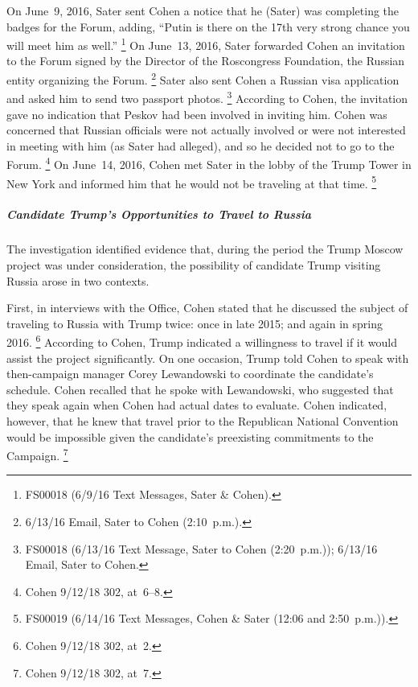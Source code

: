 On June~9, 2016, Sater sent Cohen a notice that he (Sater) was completing the badges for the Forum, adding, ``Putin is there on the 17th very strong chance you will meet him as well.''%
\footnote{FS00018 (6/9/16 Text Messages, Sater \& Cohen).}
On June~13, 2016, Sater forwarded Cohen an invitation to the Forum signed by the Director of the Roscongress Foundation, the Russian entity organizing the Forum.%
\footnote{6/13/16 Email, Sater to Cohen (2:10~p.m.).}
Sater also sent Cohen a Russian visa application and asked him to send two passport photos.%
\footnote{FS00018 (6/13/16 Text Message, Sater to Cohen (2:20~p.m.));
6/13/16 Email, Sater to Cohen.}
According to Cohen, the invitation gave no indication that Peskov had been involved in inviting him.
Cohen was concerned that Russian officials were not actually involved or were not interested in meeting with him (as Sater had alleged), and so he decided not to go to the Forum.%
\footnote{Cohen 9/12/18 302, at~6--8.}
On June~14, 2016, Cohen met Sater in the lobby of the Trump Tower in New York and informed him that he would not be traveling at that time.%
\footnote{FS00019 (6/14/16 Text Messages, Cohen \& Sater (12:06 and 2:50~p.m.)).}

\subparagraph{Candidate Trump's Opportunities to Travel to Russia}

The investigation identified evidence that, during the period the Trump Moscow project was under consideration, the possibility of candidate Trump visiting Russia arose in two contexts.

First, in interviews with the Office, Cohen stated that he discussed the subject of traveling to Russia with Trump twice: once in late 2015; and again in spring 2016.%
\footnote{Cohen 9/12/18 302, at~2.}
According to Cohen, Trump indicated a willingness to travel if it would assist the project significantly.
On one occasion, Trump told Cohen to speak with then-campaign manager Corey Lewandowski to coordinate the candidate's schedule.
Cohen recalled that he spoke with Lewandowski, who suggested that they speak again when Cohen had actual dates to evaluate.
Cohen indicated, however, that he knew that travel prior to the Republican National Convention would be impossible given the candidate's preexisting commitments to the Campaign.%
\footnote{Cohen 9/12/18 302, at~7.}

